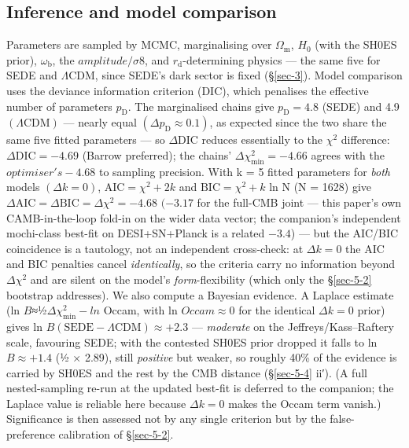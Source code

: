 \documentclass[preprint,12pt]{elsarticle}
\begin{document}
\subsection{Inference and model comparison}\label{sec-4-3}

Parameters are sampled by MCMC, marginalising over
\(\Omega _{\mathrm{m}}\), \(H_{0}\) (with the SH0ES prior),
\(\omega _{\mathrm{b}}\), the \(amplitude/\sigma 8\), and
\(r_{\mathrm{d}}\)-determining physics --- the same five for SEDE and
\(\Lambda \mathrm{CDM}\), since SEDE's dark sector is fixed
(§\ref{sec-3}). Model comparison uses the deviance information criterion
(DIC), which penalises the effective number of parameters
\(p_{\mathrm{D}}\). The marginalised chains give
\(p_{\mathrm{D}} = 4.8\) (SEDE) and 4.9 \((\Lambda \mathrm{CDM})\) ---
nearly equal \((\Delta p_{\mathrm{D}} \approx  0.1)\), as expected since
the two share the same five fitted parameters --- so
\(\Delta \mathrm{DIC}\) reduces essentially to the \(\chi ^{2}\)
difference: \(\Delta \mathrm{DIC} = -4.69\) (Barrow preferred); the
chains' \(\Delta \chi ^{2}_{\mathrm{min}} = -4.66\) agrees with the
\(optimiser's -4.68\) to sampling precision. With k = 5 fitted
parameters for \emph{both} models \((\Delta k = 0)\),
\(\mathrm{AIC} = \chi ^{2} + 2k\) and \(\mathrm{BIC} = \chi ^{2} + k\)
ln N (N = 1628) give
\(\Delta \mathrm{AIC} = \Delta \mathrm{BIC} = \Delta \chi ^{2} = -4.68\)
\((-3.17\) for the full-CMB joint --- this paper's own CAMB-in-the-loop
fold-in on the wider data vector; the companion's independent
mochi-class best-fit on DESI+SN+Planck is a related \(-3.4\)) --- but
the AIC/BIC coincidence is a tautology, not an independent cross-check:
at \(\Delta k = 0\) the AIC and BIC penalties cancel \emph{identically},
so the criteria carry no information beyond \(\Delta \chi ^{2}\) and are
silent on the model's \emph{form}-flexibility (which only the
§\ref{sec-5-2} bootstrap addresses). We also compute a Bayesian
evidence. A Laplace estimate (ln
\(B\)≈½\(\Delta \chi ^{2}_{\mathrm{min}} - ln\) Occam, with ln
\(Occam \approx  0\) for the identical \(\Delta k = 0\) prior) gives ln
\(B(\mathrm{SEDE}-\Lambda \mathrm{CDM}) \approx  +2.3\) ---
\emph{moderate} on the Jeffreys/Kass--Raftery scale, favouring SEDE;
with the contested SH0ES prior dropped it falls to ln
\(B \approx  +1.4\) (½ × 2.89), still \emph{positive} but weaker, so
roughly 40\% of the evidence is carried by SH0ES and the rest by the CMB
distance (§\ref{sec-5-4} ii′). (A full nested-sampling re-run at the
updated best-fit is deferred to the companion; the Laplace value is
reliable here because \(\Delta k = 0\) makes the Occam term vanish.)
Significance is then assessed not by any single criterion but by the
false-preference calibration of §\ref{sec-5-2}.
\end{document}
